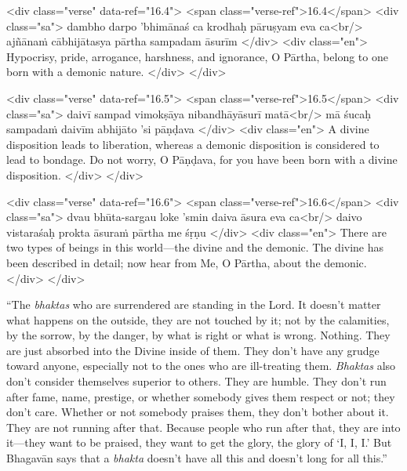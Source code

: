 \begin{html}
<div class="verse" data-ref="16.4">
  <span class="verse-ref">16.4</span>
  <div class="sa">
    dambho darpo ’bhimānaś ca krodhaḥ pāruṣyam eva ca<br/>
    ajñānaṁ cābhijātasya pārtha sampadam āsurīm
  </div>
  <div class="en">
    Hypocrisy, pride, arrogance, harshness, and ignorance, O Pārtha, belong to one born with a demonic nature.
  </div>
</div>
\end{html}



\begin{html}
<div class="verse" data-ref="16.5">
  <span class="verse-ref">16.5</span>
  <div class="sa">
    daivī sampad vimokṣāya nibandhāyāsurī matā<br/>
    mā śucaḥ sampadaṁ daivīm abhijāto ’si pāṇḍava
  </div>
  <div class="en">
    A divine disposition leads to liberation, whereas a demonic disposition is considered to lead to bondage. Do not worry, O Pāṇḍava, for you have been born with a divine disposition.
  </div>
</div>
\end{html}



\begin{html}
<div class="verse" data-ref="16.6">
  <span class="verse-ref">16.6</span>
  <div class="sa">
    dvau bhūta-sargau loke ’smin daiva āsura eva ca<br/>
    daivo vistaraśaḥ prokta āsuraṁ pārtha me śṛṇu
  </div>
  <div class="en">
    There are two types of beings in this world---the divine and the demonic. The divine has been described in detail; now hear from Me, O Pārtha, about the demonic.
  </div>
</div>
\end{html}


\enquote{The \textit{bhaktas} who are surrendered are standing in the Lord. It doesn’t matter what happens on the outside, they are not touched by it; not by the calamities, by the sorrow, by the danger, by what is right or what is wrong. Nothing. They are just absorbed into the Divine inside of them. They don’t have any grudge toward anyone, especially not to the ones who are ill-treating them. \textit{Bhaktas} also don’t consider themselves superior to others. They are humble. They don’t run after fame, name, prestige, or whether somebody gives them respect or not; they don’t care. Whether or not somebody praises them, they don’t bother about it. They are not running after that. Because people who run after that, they are into it---they want to be praised, they want to get the glory, the glory of \enquote{I, I, I.} But Bhagavān says that a \textit{bhakta} doesn’t have all this and doesn’t long for all this.}

